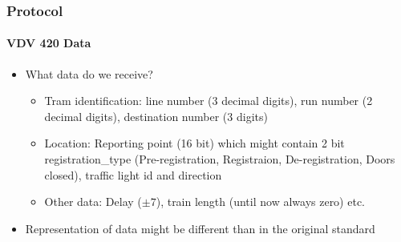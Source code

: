 \begin{frame}
\frametitle{Protocol}
\framesubtitle{VDV 420 Data}
\begin{itemize}
	\item What data do we receive?
	\begin{itemize}
		\item Tram identification: line number (3 decimal digits), run number (2 decimal digits), destination number (3 digits)
		\item Location: Reporting point (16 bit) which might contain 2 bit registration\_type (Pre-registration, Registraion, De-registration, Doors closed), traffic light id and direction
		\item Other data: Delay ($\pm 7$), train length (until now always zero) etc.
	\end{itemize}
	\item Representation of data might be different than in the original standard
\end{itemize}
\end{frame}


